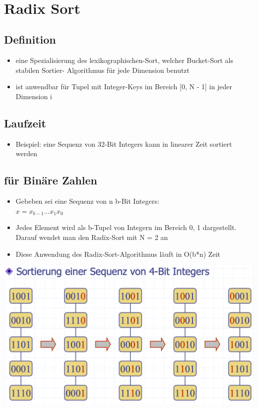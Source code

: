 \vfill
$ $
\columnbreak


\section{Radix Sort}
\subsection{Definition}
\begin{itemize}
    \item eine Spezialisierung des lexikographischen-Sort, welcher Bucket-Sort als stabilen Sortier- Algorithmus für jede Dimension benutzt
    \item ist anwendbar für Tupel mit Integer-Keys im Bereich [0, N - 1] in jeder Dimension i
\end{itemize}

\subsection{Laufzeit}
\begin{itemize}
    \item Beispiel: eine Sequenz von 32-Bit Integers kann in linearer Zeit sortiert werden
\end{itemize}

\subsection{für Binäre Zahlen}
\begin{itemize}
    \item Gebeben sei eine Sequenz von n b-Bit Integers:\\
    $x = x_{b - 1} ... x_1x_0$
    \item Jedes Element wird als b-Tupel von Integern im Bereich {0, 1} dargestellt. Darauf wendet man den Radix-Sort mit N = 2 an
    \item Diese Anwendung des Radix-Sort-Algorithmus läuft in O(b*n) Zeit
\end{itemize}


\vspace{-8pt}
\begin{center}
    \includegraphics[scale=.2]{graphic/07 RadixSort/radix.png}
\end{center}
\vspace{-8pt}


\paragraph{}


\newpage